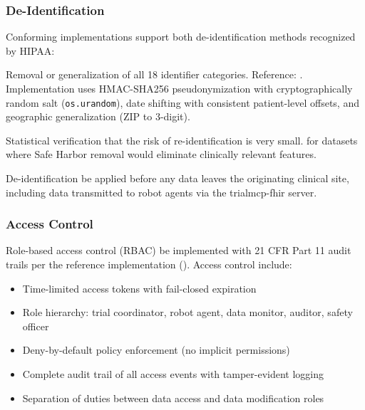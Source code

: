 \documentclass[11pt,letterpaper]{article}
\begin{document}
\subsubsection{De-Identification}

Conforming implementations \SHALL{} support both de-identification methods recognized by HIPAA:

\begin{description}[leftmargin=3.5cm, style=sameline]
  \item[Safe Harbor] Removal or generalization of all 18 identifier categories. Reference: . Implementation uses HMAC-SHA256 pseudonymization with cryptographically random salt (\texttt{os.urandom}), date shifting with consistent patient-level offsets, and geographic generalization (ZIP to 3-digit).

  \item[Expert Determination] Statistical verification that the risk of re-identification is very small. \RECOMMENDED{} for datasets where Safe Harbor removal would eliminate clinically relevant features.
\end{description}

De-identification \SHALL{} be applied before any data leaves the originating clinical site, including data transmitted to robot agents via the trialmcp-fhir server.

\subsubsection{Access Control}

Role-based access control (RBAC) \SHALL{} be implemented with 21 CFR Part 11 audit trails per the reference implementation (). Access control \SHALL{} include:

\begin{itemize}
  \item Time-limited access tokens with fail-closed expiration
  \item Role hierarchy: trial coordinator, robot agent, data monitor, auditor, safety officer
  \item Deny-by-default policy enforcement (no implicit permissions)
  \item Complete audit trail of all access events with tamper-evident logging
  \item Separation of duties between data access and data modification roles
\end{itemize}
\end{document}
